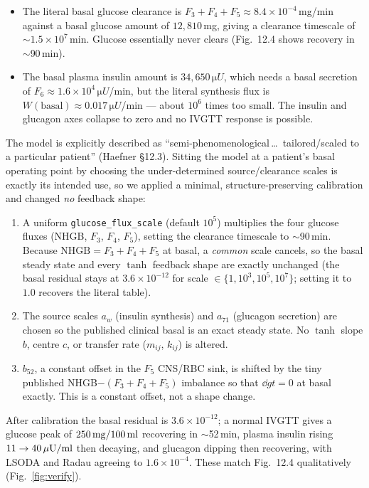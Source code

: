 \begin{itemize}[leftmargin=1.4em,itemsep=1pt]
\item The literal basal glucose clearance is $F_3+F_4+F_5\approx8.4\times10^{-4}\,$mg/min against a
basal glucose amount of $12{,}810$\,mg, giving a clearance timescale of $\sim1.5\times10^{7}$\,min.
Glucose essentially never clears (Fig.~12.4 shows recovery in $\sim$90\,min).
\item The basal plasma insulin amount is $34{,}650\,\si{\micro U}$, which needs a basal secretion of
$F_6\approx1.6\times10^{4}\,\si{\micro U}$/min, but the literal synthesis flux is
$W(\text{basal})\approx0.017\,\si{\micro U}$/min --- about $10^{6}$ times too small. The insulin and
glucagon axes collapse to zero and no IVGTT response is possible.
\end{itemize}

The model is explicitly described as ``semi-phenomenological\,\dots\ tailored/scaled to a particular
patient'' (Haefner \S12.3). Sitting the model at a patient's basal operating point by choosing the
under-determined source/clearance scales is exactly its intended use, so we applied a minimal,
structure-preserving calibration and changed \emph{no} feedback shape:

\begin{enumerate}[leftmargin=1.5em,itemsep=2pt]
\item A uniform \texttt{glucose\_flux\_scale} (default $10^{5}$) multiplies the four glucose fluxes
(NHGB, $F_3$, $F_4$, $F_5$), setting the clearance timescale to $\sim$90\,min. Because
$\mathrm{NHGB}=F_3+F_4+F_5$ at basal, a \emph{common} scale cancels, so the basal steady state and
every $\tanh$ feedback shape are exactly unchanged (the basal residual stays at $3.6\times10^{-12}$
for scale $\in\{1,10^{3},10^{5},10^{7}\}$; setting it to $1.0$ recovers the literal table).
\item The source scales $a_w$ (insulin synthesis) and $a_{71}$ (glucagon secretion) are chosen so the
published clinical basal is an exact steady state. No $\tanh$ slope $b$, centre $c$, or transfer rate
($m_{ij}$, $k_{ij}$) is altered.
\item $b_{52}$, a constant offset in the $F_5$ CNS/RBC sink, is shifted by the tiny published
NHGB$-(F_3+F_4+F_5)$ imbalance so that $\dd{g}{t}=0$ at basal exactly. This is a constant offset,
not a shape change.
\end{enumerate}

After calibration the basal residual is $3.6\times10^{-12}$; a normal IVGTT gives a glucose peak of
$250\,\mathrm{mg}/100\,\mathrm{ml}$ recovering in $\sim$52\,min, plasma insulin rising $11\to40\,\mu\mathrm{U}/\mathrm{ml}$ then decaying, and glucagon
dipping then recovering, with LSODA and Radau agreeing to $1.6\times10^{-4}$. These match Fig.~12.4
qualitatively (Fig.~\ref{fig:verify}).

